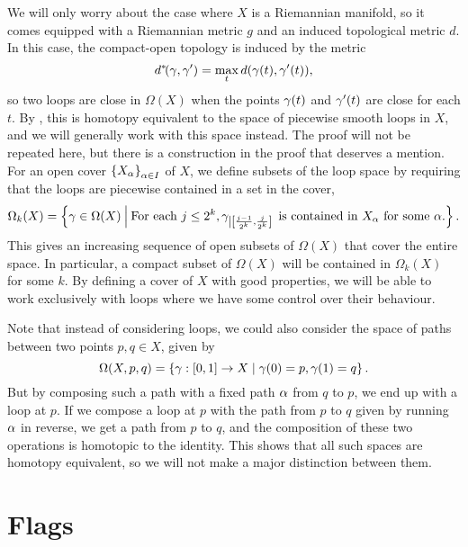We will only worry about the case where $X$ is a Riemannian manifold,
so it comes equipped with a Riemannian metric $g$ and an induced
topological metric $d$. In this case, the compact-open topology is
induced by the metric
\[ d^*\!(\gamma,\gamma') = \max_t d(\gamma(t),\gamma'(t)), \]
so two loops are close in $\Omega(X)$ when the points $\gamma(t)$ and
$\gamma'(t)$ are close for each $t$.
By \cite[Theorem 17.1]{milnor}, this is homotopy equivalent to the
space of piecewise smooth loops in $X$, and we will generally work
with this space instead. The proof will not be repeated here, but
there is a construction in the proof that deserves a mention. For an
open cover $\left\{ X_\alpha \right\}_{\alpha\in I}$ of $X$, we define subsets of the
loop space by requiring that the loops are piecewise contained in a
set in the cover,
\[ \Omega_k(X) = \left\{ \gamma \in \Omega(X) \: \Big\vert\:
  \text{For each } j \leq 2^k, \gamma_{\left|\left[
        \frac{j-1}{2^k},\frac{j}{2^k} \right]\right.} \text{ is 
    contained in $X_\alpha$ for some $\alpha$.}  \right\}. \]
This gives an increasing sequence of open subsets of $\Omega(X)$
that cover the entire space. In particular, a compact subset of
$\Omega(X)$ will be contained in $\Omega_k(X)$ for some $k$. By
defining a cover of $X$ with good properties, we will be able to work
exclusively with loops where we have some control
over their behaviour.



Note that instead of considering loops, we could also consider the
space of paths between two points $p,q\in X$, given by
\[ \Omega(X,p,q) = \left\{  \gamma : [0,1] \to X \mid \gamma(0) = p, \gamma(1) = q
 \right\}. \]
But by composing such a path with a fixed path $\alpha$ from $q$ to $p$,
we end up with a loop at $p$. If we compose a loop at $p$ with the
path from $p$ to $q$ given by running $\alpha$ in reverse, we get a path
from $p$ to $q$, and the composition of these two operations is
homotopic to the identity. This shows that all such spaces 
are homotopy equivalent, so we will not make a major distinction
between them.

\section{Flags}
\label{sec:flags}

